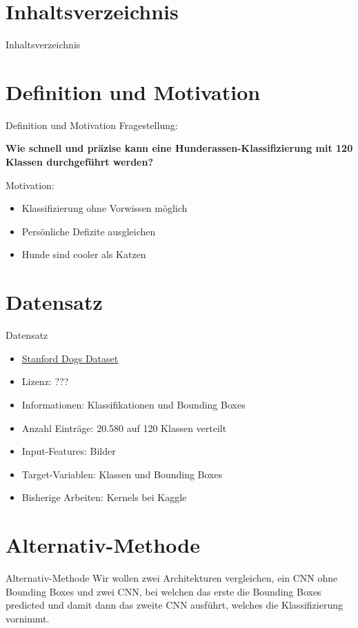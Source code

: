 


\maketitle
  \section*{Inhaltsverzeichnis}
  \begin{frame}{Inhaltsverzeichnis}
    \tableofcontents
  \end{frame}

  \section{Definition und Motivation}
  \begin{frame}{Definition und Motivation}
    Fragestellung:
    \begin{center}
      \textbf{Wie schnell und präzise kann eine Hunderassen-Klassifizierung mit 120 Klassen
      durchgeführt werden?}
    \end{center}
    Motivation:
    \begin{itemize}
      \item Klassifizierung ohne Vorwissen möglich
      \item Persönliche Defizite ausgleichen
      \item Hunde sind cooler als Katzen
    \end{itemize}
  \end{frame}
  \section{Datensatz}
  \begin{frame}{Datensatz}
    \begin{itemize}
      \item \href{https://www.kaggle.com/jessicali9530/stanford-dogs-dataset}{Stanford Dogs Dataset}
      \item Lizenz: ???
      \item Informationen: Klassifikationen und Bounding Boxes
      \item Anzahl Einträge: 20.580 auf 120 Klassen verteilt
      \item Input-Features: Bilder
      \item Target-Variablen: Klassen und Bounding Boxes
      \item Bisherige Arbeiten: Kernels bei Kaggle
    \end{itemize}
  \end{frame}

  \section{Alternativ-Methode}
  \begin{frame}{Alternativ-Methode}
    Wir wollen zwei Architekturen vergleichen, ein CNN ohne Bounding Boxes und zwei
    CNN, bei welchen das erste die Bounding Boxes predicted und damit dann das zweite
    CNN ausführt, welches die Klassifizierung vornimmt.
  \end{frame}

